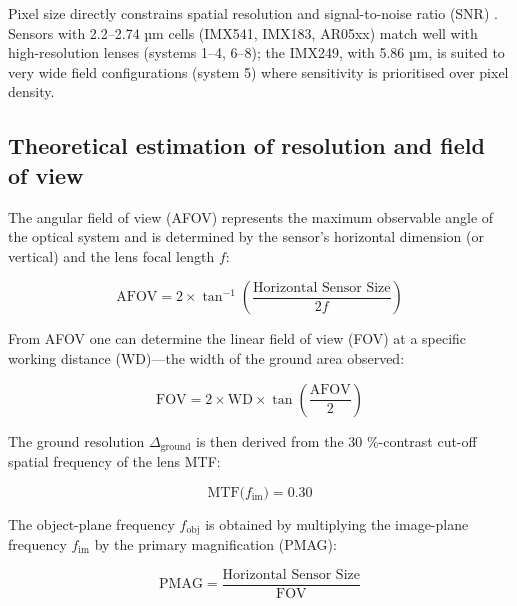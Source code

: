 \noindent Pixel size directly constrains spatial resolution and signal-to-noise
ratio (SNR) \cite{Chen2000HowBe}.  Sensors with 2.2–2.74 µm cells
(IMX541, IMX183, AR05xx) match well with high-resolution lenses
(systems 1–4, 6–8); the IMX249, with 5.86 µm, is suited to very wide
field configurations (system 5) where sensitivity is prioritised over
pixel density.\\

\subsection{Theoretical estimation of resolution and field of view}
\label{sec:res_sim}

The angular field of view (AFOV) represents the maximum observable
angle of the optical system and is determined by the sensor’s horizontal
dimension (or vertical) and the lens focal length \(f\):

\begin{equation}
    \label{eq:afov}
    \mathrm{AFOV}=2 \times \tan^{-1}\!\left(\frac{\text{Horizontal Sensor Size}}{2f}\right)
\end{equation}

\noindent From AFOV one can determine the linear field of view (FOV) at a specific
working distance (WD)—the width of the ground area observed:

\begin{equation}
    \mathrm{FOV}=2 \times \mathrm{WD} \times \tan \!\left(\frac{\mathrm{AFOV}}{2}\right)
\end{equation}

\noindent The ground resolution \(\Delta_{\text{ground}}\) is then derived from the
30 \%-contrast cut-off spatial frequency of the lens MTF:

\begin{equation}
    \text{MTF}\bigl(f_{\text{im}}\bigr)=0.30
    \label{eq:mtf_cutoff}
\end{equation}

\noindent The object-plane frequency \(f_{\text{obj}}\) is obtained by
multiplying the image-plane frequency \(f_{\text{im}}\) by the primary
magnification (PMAG):

\begin{equation}
    \text{PMAG}= \frac{\text{Horizontal Sensor Size}}{\text{FOV}}
    \label{eq:pmag}
\end{equation}

